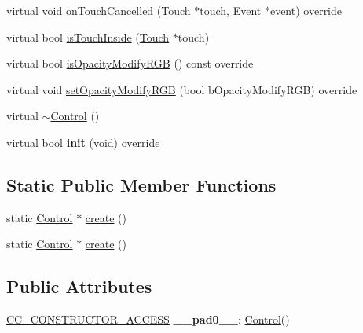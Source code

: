 \begin{DoxyCompactItemize}
virtual void \hyperlink{classControl_ab7fb8582f430d82180dbefea27c4cff9}{on\+Touch\+Cancelled} (\hyperlink{classTouch}{Touch} $\ast$touch, \hyperlink{classEvent}{Event} $\ast$event) override
\item 
virtual bool \hyperlink{classControl_af493eab0c7b003e9f18816d88c079952}{is\+Touch\+Inside} (\hyperlink{classTouch}{Touch} $\ast$touch)
\item 
virtual bool \hyperlink{classControl_ac49bc0859aade4ad1ab6311941b4207a}{is\+Opacity\+Modify\+R\+GB} () const override
\item 
virtual void \hyperlink{classControl_afc69bf17ee302a8efd9db70d5bb4c5b7}{set\+Opacity\+Modify\+R\+GB} (bool b\+Opacity\+Modify\+R\+GB) override
\item 
virtual \hyperlink{classControl_a51dc2be00da24c37b12ac74ef654e478}{$\sim$\+Control} ()
\item 
\mbox{\label{classControl_a4a1c8bd0e7c04c8d73f1abff3c26eb8e}} 
virtual bool {\bfseries init} (void) override
\end{DoxyCompactItemize}
\subsection*{Static Public Member Functions}
\begin{DoxyCompactItemize}
\item 
static \hyperlink{classControl}{Control} $\ast$ \hyperlink{classControl_adeb76cd686f2524adbc38df9ad345c9f}{create} ()
\item 
static \hyperlink{classControl}{Control} $\ast$ \hyperlink{classControl_ae8c17a434d15e570a1a3eb4900ee43e2}{create} ()
\end{DoxyCompactItemize}
\subsection*{Public Attributes}
\begin{DoxyCompactItemize}
\item 
\mbox{\label{classControl_aa66ac25a8c28e56deba52c35df0c672b}} 
\hyperlink{_2cocos2d_2cocos_2base_2ccConfig_8h_a25ef1314f97c35a2ed3d029b0ead6da0}{C\+C\+\_\+\+C\+O\+N\+S\+T\+R\+U\+C\+T\+O\+R\+\_\+\+A\+C\+C\+E\+SS} {\bfseries \+\_\+\+\_\+pad0\+\_\+\+\_\+}\+: \hyperlink{classControl}{Control}()
\end{DoxyCompactItemize}
